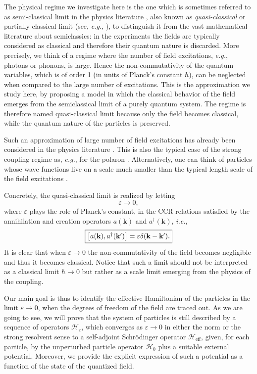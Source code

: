 \documentclass[11pt,a4paper,reqno]{amsart}
\theoremstyle{definition}
\numberwithin{equation}{section}
\newcommand{\beq}{\begin{equation}}
\newcommand{\eeq}{\end{equation}}
\newcommand{\lf}{\left}
\newcommand{\ri}{\right}
\newcommand{\kv}{\mathbf{k}}
\newcommand{\kvp}{\mathbf{k}^{\prime}}
\newcommand{\eps}{\varepsilon}
\newcommand{\HH}{\mathcal{H}}
\newcommand{\HHe}{\mathcal{H}_{\mathrm{eff}}}
\begin{document}
The physical regime we investigate here is the one which is sometimes referred to as semi-classical limit in
the physics literature \cite{PhysRevB.87.094301,CBO9780511778261A024,KalAubTsi98}, also known as {\it
  quasi-classical} or partially classical limit (see, \emph{e.g.}, \cite{MR2205462,MR1718657}), to distinguish
it from the vast mathematical literature about semiclassics: in the experiments the fields are typically
considered as classical and therefore their quantum nature is discarded. More precisely, we think of a regime
where the number of field excitations, {\it e.g.}, photons or phonons, is large. Hence the non-commutativity
of the quantum variables, which is of order 1 (in units of Planck's constant $ \hbar $), can be neglected when
compared to the large number of excitations. This is the approximation we study here, by proposing a model in
which the classical behavior of the field emerges from the semiclassical limit of a purely quantum system. The
regime is therefore named quasi-classical limit because only the field becomes classical, while the quantum
nature of the particles is preserved.

Such an approximation of large number of field excitations has already been considered in the physics
literature \cite{PhysRevB.87.094301}. This is also the typical case of the strong coupling regime as,
\emph{e.g.}, for the polaron \cite{Frank:2014aa,Frank:2015aa,Griesemer:2016aa}. Alternatively, one can think
of particles whose wave functions live on a scale much smaller than the typical length scale of the field
excitations \cite{KalAubTsi98}.

Concretely, the quasi-classical limit is realized by letting
\beq
	\eps \to 0,
\eeq
where $ \eps $ plays the role of Planck's constant, in the CCR relations satisfied by the annihilation and creation operators $ a(\kv) $ and $ a^{\dagger}(\kv) $, \emph{i.e.},
\beq
	\label{eq:CCR}
	\framebox{$ \lf[ a(\kv), a^{\dagger}(\kvp) \ri] = \eps \delta(\kv - \kvp). $}
\eeq
It is clear that when $\varepsilon\to 0$ the non-commutativity of the field becomes negligible and thus it becomes classical. Notice that such a limit should not be interpreted as a classical limit $ \hbar \to 0 $ but rather as a scale limit emerging from the physics of the coupling. 

Our main goal is thus to identify the effective Hamiltonian of the particles in the limit $ \eps \to 0 $, when
the degrees of freedom of the field are traced out. As we are going to see, we will prove that the system of
particles is still described by a sequence of operators $ \HH_{\eps} $, which converges as $ \eps \to 0 $ in
either the norm or the strong resolvent sense to a self-adjoint Schr\"{o}dinger operator $ \HHe $, given, for
each particle, by the unperturbed particle operator $ \HH_0 $ plus a suitable external potential. Moreover, we provide
the explicit expression of such a potential as a function of the state of the quantized field. 
\end{document}
